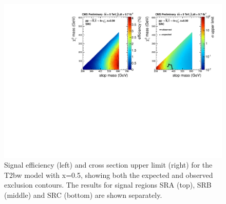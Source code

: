 \begin{figure}[hbt]
\begin{center}
        \includegraphics[width=1.\linewidth]{plots/T2bw_x50_SRC.pdf}
    \caption{Signal efficiency (left) and cross section upper limit
      (right) for the T2bw model with x=0.5, showing both the expected and
      observed exclusion contours. The results for signal regions SRA (top),
      SRB (middle) and SRC (bottom) are shown separately.}
\label{fig:allsrlimitsT2bw0p5}
      \end{center}
\end{figure}




